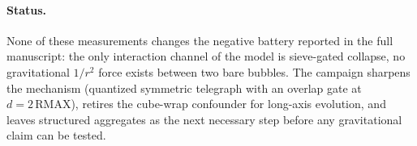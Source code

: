 \documentclass{ijuc}
\begin{document}
\paragraph{Status.} None of these measurements changes the negative battery
reported in the full manuscript: the only interaction channel of the model is
sieve-gated collapse, no gravitational $1/r^2$ force exists between two bare
bubbles.
The campaign sharpens the mechanism (quantized symmetric telegraph with an
overlap gate at $d=2\,\mathrm{RMAX}$), retires the cube-wrap confounder for
long-axis evolution, and leaves structured aggregates as the next necessary
step before any gravitational claim can be tested.
\end{document}

